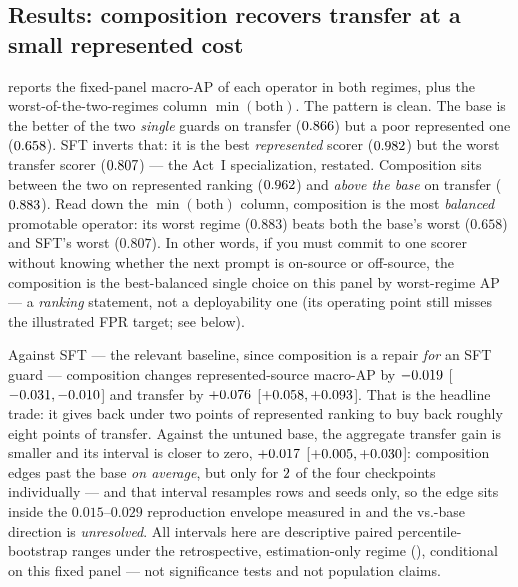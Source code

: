 \subsection{Results: composition recovers transfer at a small represented cost}
\label{sec:actIII-results}

 reports the fixed-panel macro-AP of each operator in both regimes, plus
the worst-of-the-two-regimes column $\min(\text{both})$. The pattern is clean. The base is the
better of the two \emph{single} guards on transfer ($0.866$) but a poor represented one
($0.658$). SFT inverts that: it is the best \emph{represented} scorer
($0.982$) but the worst transfer scorer ($0.807$) --- the Act~I
specialization, restated. Composition sits between the two on represented ranking
($0.962$) and \emph{above the base} on transfer
($0.883$). Read down the $\min(\text{both})$ column, composition is the most
\emph{balanced} promotable operator: its worst regime ($0.883$) beats both the base's worst
($0.658$) and SFT's worst ($0.807$). In other words, if you must commit to one scorer without
knowing whether the next prompt is on-source or off-source, the composition is the best-balanced single
choice on this panel by worst-regime AP --- a \emph{ranking} statement, not a deployability one (its
operating point still misses the illustrated FPR target; see below).



Against SFT --- the relevant baseline, since composition is a repair \emph{for} an SFT guard ---
composition changes represented-source macro-AP by $-0.019$
[$-0.031,-0.010$] and transfer by $+0.076$
[$+0.058,+0.093$]. That is the headline trade: it gives
back under two points of represented ranking to buy back roughly eight points of transfer.
Against the untuned base, the aggregate transfer gain is smaller and its interval is closer to
zero, $+0.017$ [$+0.005,+0.030$]:
composition edges past the base \emph{on average}, but only for $2$ of
the four checkpoints individually --- and that interval resamples rows and seeds only, so the edge sits
inside the $0.015$--$0.029$ reproduction envelope measured in  and the
vs.-base direction is \emph{unresolved}. All intervals here are descriptive paired percentile-bootstrap
ranges under the retrospective, estimation-only regime (\PilotEvidenceStatus{}), conditional on
this fixed panel --- not significance tests and not population claims.

